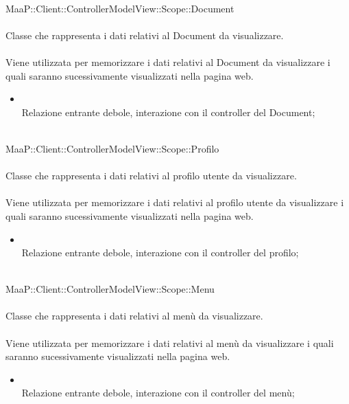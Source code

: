 	\\
	MaaP::Client::ControllerModelView::Scope::Document\\
	\\
	Classe che rappresenta i dati relativi al Document da visualizzare.\\
	\\
	Viene utilizzata per memorizzare i dati relativi al Document da visualizzare i quali saranno sucessivamente visualizzati nella pagina web.\\
	\begin{itemize}
	\item{}\\
	Relazione entrante debole, interazione con il controller del Document;
	\end{itemize}
	
	\\
	MaaP::Client::ControllerModelView::Scope::Profilo\\
	\\
	Classe che rappresenta i dati relativi al profilo utente da visualizzare.\\
	\\
	Viene utilizzata per memorizzare i dati relativi al profilo utente da visualizzare i quali saranno sucessivamente visualizzati nella pagina web.\\
	\begin{itemize}
	\item{}\\
	Relazione entrante debole, interazione con il controller del profilo;
	\end{itemize}
	
	\\
	MaaP::Client::ControllerModelView::Scope::Menu\\
	\\
	Classe che rappresenta i dati relativi al menù da visualizzare.\\
	\\
	Viene utilizzata per memorizzare i dati relativi al menù da visualizzare i quali saranno sucessivamente visualizzati nella pagina web.\\
	\begin{itemize}
	\item{}\\
	Relazione entrante debole, interazione con il controller del menù;
	\end{itemize}
	

